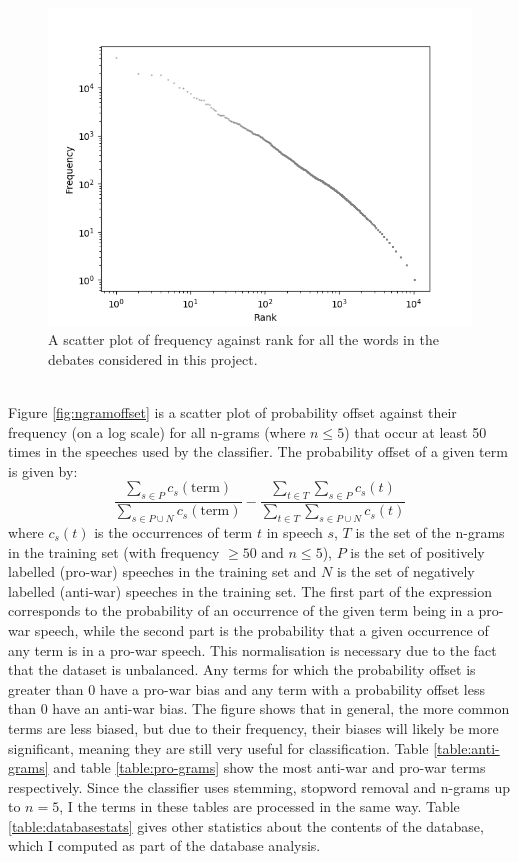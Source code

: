 \documentclass[12pt,a4paper,twoside,openright]{report}
\begin{document}
\\
\begin{figure}
	\begin{center}
		\includegraphics[scale=1]{figs/bigzipf.png}
	\end{center}
	\caption{A scatter plot of frequency against rank for all the words in the debates considered in this project.}
	\label{fig:bigzipf}
\end{figure}
\\
Figure \ref{fig:ngramoffset} is a scatter plot of probability offset against their frequency (on a log scale) for all n-grams (where $n \le 5$) that occur at least 50 times in the speeches used by the classifier. The probability offset of a given term is given by:
\begin{equation}
	\frac{\sum_{s \in P}c_{s}(\text{term})}{\sum_{s \in P \cup N}c_{s}(\text{term})} - \frac{\sum_{t \in T}\sum_{s \in P}c_{s}(t)}{\sum_{t \in T}\sum_{s \in P \cup N}c_{s}(t)}
\end{equation}
where $c_{s}(t)$ is the occurrences of term $t$ in speech $s$, $T$ is the set of the n-grams in the training set (with frequency $\ge 50$ and $n \le 5$), $P$ is the set of positively labelled (pro-war) speeches in the training set and $N$ is the set of negatively labelled (anti-war) speeches in the training set. The first part of the expression corresponds to the probability of an occurrence of the given term being in a pro-war speech, while the second part is the probability that a given occurrence of any term is in a pro-war speech. This normalisation is necessary due to the fact that the dataset is unbalanced. Any terms for which the probability offset is greater than 0 have a pro-war bias and any term with a probability offset less than 0 have an anti-war bias. The figure shows that in general, the more common terms are less biased, but due to their frequency, their biases will likely be more significant, meaning they are still very useful for classification. Table \ref{table:anti-grams} and table \ref{table:pro-grams} show the most anti-war and pro-war terms respectively. Since the classifier uses stemming, stopword removal and n-grams up to $n=5$, I the terms in these tables are processed in the same way. Table \ref{table:databasestats} gives other statistics about the contents of the database, which I computed as part of the database analysis.
\end{document}
